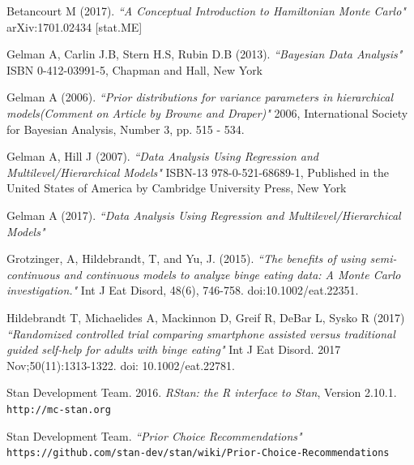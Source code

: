 \documentclass{article}
\begin{document}
\begin{thebibliography}{9}

Betancourt M (2017).
\textit{``A Conceptual Introduction to Hamiltonian Monte Carlo"} 
arXiv:1701.02434 [stat.ME]

Gelman A, Carlin J.B, Stern H.S, Rubin D.B (2013).
\textit{``Bayesian Data Analysis"}
ISBN 0-412-03991-5, Chapman and Hall, New York

Gelman A (2006).
\textit{``Prior distributions for variance parameters in hierarchical models(Comment on Article by Browne and Draper)"}
2006, International Society for Bayesian Analysis, Number 3, pp. 515 - 534.

Gelman A, Hill J (2007).
\textit{``Data Analysis Using Regression and Multilevel/Hierarchical Models"}
ISBN-13 978-0-521-68689-1, Published in the United States of America by Cambridge University Press, New York

Gelman A (2017).
\textit{``Data Analysis Using Regression and Multilevel/Hierarchical Models"}

Grotzinger, A, Hildebrandt, T, and Yu, J. (2015). 
\textit{``The benefits of using semi-continuous and continuous models to analyze binge eating data: A Monte Carlo investigation."}
 Int J Eat Disord, 48(6), 746-758. doi:10.1002/eat.22351.
 
Hildebrandt T, Michaelides A, Mackinnon D, Greif R, DeBar L, Sysko R (2017)
\textit{``Randomized controlled trial comparing smartphone assisted
versus traditional guided self-help for adults with binge eating"}
Int J Eat Disord. 2017 Nov;50(11):1313-1322. doi: 10.1002/eat.22781.

Stan Development Team. 2016. 
\textit{RStan: the R interface to Stan}, Version 2.10.1.   
\texttt{http://mc-stan.org}

Stan Development Team.
\textit{``Prior Choice Recommendations"}
\texttt{https://github.com/stan-dev/stan/wiki/Prior-Choice-Recommendations}

\end{thebibliography}
\end{document}
